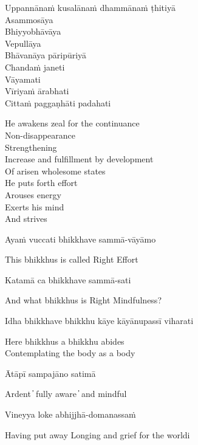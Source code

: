 Uppannānaṁ kusalānaṁ dhammānaṁ ṭhitiyā\\
Asammosāya\\
Bhiyyobhāvāya\\
Vepullāya\\
Bhāvanāya pāripūriyā\\
Chandaṁ janeti\\
Vāyamati\\
Vīriyaṁ ārabhati\\
Cittaṁ paggaṇhāti padahati

\begin{cprenglish}
He awakens zeal for the continuance\\
Non-disappearance\\
Strengthening\\
Increase and fulfillment by development\\
Of arisen wholesome states\\
He puts forth effort\\
Arouses energy\\
Exerts his mind\\
And strives
\end{cprenglish}

Ayaṁ vuccati bhikkhave sammā-vāyāmo

\begin{cprenglish}
This bhikkhus is called Right Effort
\end{cprenglish}

Katamā ca bhikkhave sammā-sati

\begin{cprenglish}
And what bhikkhus is Right Mindfulness?
\end{cprenglish}

Idha bhikkhave bhikkhu kāye kāyānupassī viharati

\begin{cprenglish}
Here bhikkhus a bhikkhu abides\\
Contemplating the body as a body
\end{cprenglish}

Ātāpī sampajāno satimā

\begin{cprenglish}
Ardent  ̓  fully aware  ̓  and mindful
\end{cprenglish}

Vineyya loke abhijjhā-domanassaṁ

\begin{cprenglish}
Having put away
Longing and grief for the worldi
\end{cprenglish}


